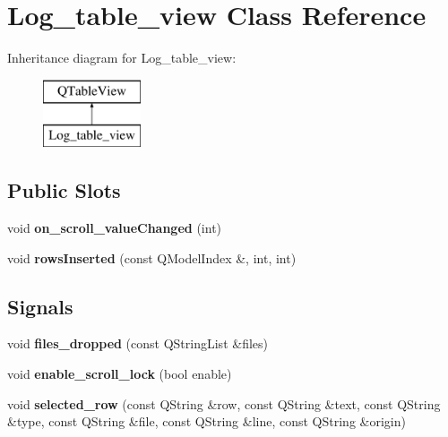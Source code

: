 \hypertarget{class_log__table__view}{\section{Log\-\_\-table\-\_\-view Class Reference}
\label{class_log__table__view}
}
Inheritance diagram for Log\-\_\-table\-\_\-view\-:\begin{figure}[H]
\begin{center}
\leavevmode
\includegraphics[height=2.000000cm]{class_log__table__view}
\end{center}
\end{figure}
\subsection*{Public Slots}
\begin{DoxyCompactItemize}
\item 
\hypertarget{class_log__table__view_ab2a92cf274fb22465da37f683e67c90b}{void {\bfseries on\-\_\-scroll\-\_\-value\-Changed} (int)}\label{class_log__table__view_ab2a92cf274fb22465da37f683e67c90b}

\item 
\hypertarget{class_log__table__view_aad910b1f34b59b2a1e93ad5b4178733e}{void {\bfseries rows\-Inserted} (const Q\-Model\-Index \&, int, int)}\label{class_log__table__view_aad910b1f34b59b2a1e93ad5b4178733e}

\end{DoxyCompactItemize}
\subsection*{Signals}
\begin{DoxyCompactItemize}
\item 
\hypertarget{class_log__table__view_aa0994c349e5e7059f2f2a31da6222088}{void {\bfseries files\-\_\-dropped} (const Q\-String\-List \&files)}\label{class_log__table__view_aa0994c349e5e7059f2f2a31da6222088}

\item 
\hypertarget{class_log__table__view_a2b269c4fe6915b89410b7aff98addf84}{void {\bfseries enable\-\_\-scroll\-\_\-lock} (bool enable)}\label{class_log__table__view_a2b269c4fe6915b89410b7aff98addf84}

\item 
\hypertarget{class_log__table__view_ac21ba7d1330fef6e8d296152c3d4e51a}{void {\bfseries selected\-\_\-row} (const Q\-String \&row, const Q\-String \&text, const Q\-String \&type, const Q\-String \&file, const Q\-String \&line, const Q\-String \&origin)}\label{class_log__table__view_ac21ba7d1330fef6e8d296152c3d4e51a}

\end{DoxyCompactItemize}
